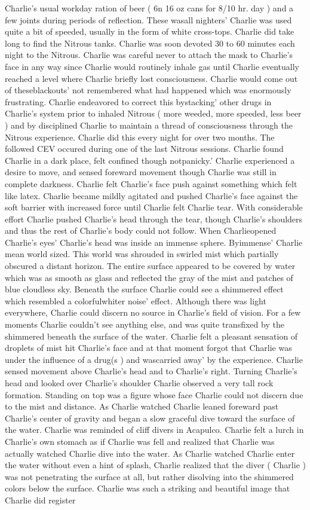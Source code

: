 \documentclass[12pt]{book}
\begin{document}
Charlie's usual workday ration of beer ( 6n 16 oz cans for 8/10 hr. day ) and a few joints during periods of reflection. These wasall nighters' Charlie was used quite a bit of speeded, usually in the form of white cross-tops. Charlie did take long to find the Nitrous tanks. Charlie was soon devoted 30 to 60 minutes each night to the Nitrous. Charlie was careful never to attach the mask to Charlie's face in any way since Charlie would routinely inhale gas until Charlie eventually reached a level where Charlie briefly lost consciousness. Charlie would come out of theseblackouts' not remembered what had happened which was enormously frustrating. Charlie endeavored to correct this bystacking' other drugs in Charlie's system prior to inhaled Nitrous ( more weeded, more speeded, less beer ) and by disciplined Charlie to maintain a thread of consciousness through the Nitrous experience. Charlie did this every night for over two months. The followed CEV occured during one of the last Nitrous sessions. Charlie found Charlie in a dark place, felt confined though notpanicky.' Charlie experienced a desire to move, and sensed foreward movement though Charlie was still in complete darkness. Charlie felt Charlie's face push against something which felt like latex. Charlie became mildly agitated and pushed Charlie's face against the soft barrier with increased force until Charlie felt Charlie tear. With considerable effort Charlie pushed Charlie's head through the tear, though Charlie's shoulders and thus the rest of Charlie's body could not follow. When Charlieopened Charlie's eyes' Charlie's head was inside an immense sphere. Byimmense' Charlie mean world sized. This world was shrouded in swirled mist which partially obscured a distant horizon. The entire surface appeared to be covered by water which was as smooth as glass and reflected the gray of the mist and patches of blue cloudless sky. Beneath the surface Charlie could see a shimmered effect which resembled a colorfulwhiter noise' effect. Although there was light everywhere, Charlie could discern no source in Charlie's field of vision. For a few moments Charlie couldn't see anything else, and was quite transfixed by the shimmered beneath the surface of the water. Charlie felt a pleasant sensation of droplets of mist hit Charlie's face and at that moment forgot that Charlie was under the influence of a drug(s ) and wascarried away' by the experience. Charlie sensed movement above Charlie's head and to Charlie's right. Turning Charlie's head and looked over Charlie's shoulder Charlie observed a very tall rock formation. Standing on top was a figure whose face Charlie could not discern due to the mist and distance. As Charlie watched Charlie leaned foreward past Charlie's center of gravity and began a slow graceful dive toward the surface of the water. Charlie was reminded of cliff divers in Acapulco. Charlie felt a lurch in Charlie's own stomach as if Charlie was fell and realized that Charlie was actually watched Charlie dive into the water. As Charlie watched Charlie enter the water without even a hint of splash, Charlie realized that the diver ( Charlie ) was not penetrating the surface at all, but rather disolving into the shimmered colors below the surface. Charlie was such a striking and beautiful image that Charlie did register 
\end{document}
